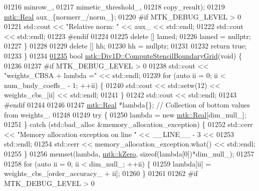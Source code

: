 \begin{DoxyCode}
{{01216                                                         minrow\_,
01217                                                         mimetic\_threshold\_,
01218                                                         copy\_result);
01219     \hyperlink{group__c01-roots_gac080bbbf5cbb5502c9f00405f894857d}{mtk::Real} aux\_\{normerr\_/norm\_\};
01220 \textcolor{preprocessor}{    #if MTK\_DEBUG\_LEVEL > 0}
01221     std::cout << \textcolor{stringliteral}{"Relative norm: "} << aux\_ << std::endl;
01222     std::cout << std::endl;
01223 \textcolor{preprocessor}{    #endif}
01224 
01225     \textcolor{keyword}{delete} [] lamed;
01226     lamed = \textcolor{keyword}{nullptr};
01227   \}
01228 
01229   \textcolor{keyword}{delete} [] hh;
01230   hh = \textcolor{keyword}{nullptr};
01231 
01232   \textcolor{keywordflow}{return} \textcolor{keyword}{true};
01233 \}
01234 
\hypertarget{mtk__div__1d_8cc_source_l01235}{}\hyperlink{classmtk_1_1Div1D_a29bb417c76286414dce9258a0bcb5aab}{01235} \textcolor{keywordtype}{bool} \hyperlink{classmtk_1_1Div1D_a29bb417c76286414dce9258a0bcb5aab}{mtk::Div1D::ComputeStencilBoundaryGrid}(\textcolor{keywordtype}{void}) \{
01236 
01237 \textcolor{preprocessor}{  #if MTK\_DEBUG\_LEVEL > 0}
01238   std::cout << \textcolor{stringliteral}{"weights\_CBSA + lambda ="} << std::endl;
01239   \textcolor{keywordflow}{for} (\textcolor{keyword}{auto} ii = 0; ii < num\_bndy\_coeffs\_ - 1; ++ii) \{
01240     std::cout << std::setw(12) << weights\_cbs\_[ii] << std::endl;
01241   \}
01242   std::cout << std::endl;
01243 \textcolor{preprocessor}{  #endif}
01244 
01246 
01247   \hyperlink{group__c01-roots_gac080bbbf5cbb5502c9f00405f894857d}{mtk::Real} *lambda\{\}; \textcolor{comment}{// Collection of bottom values from weights\_.}
01248 
01249   \textcolor{keywordflow}{try} \{
01250     lambda = \textcolor{keyword}{new} \hyperlink{group__c01-roots_gac080bbbf5cbb5502c9f00405f894857d}{mtk::Real}[dim\_null\_];
01251   \} \textcolor{keywordflow}{catch} (std::bad\_alloc &memory\_allocation\_exception) \{
01252     std::cerr << \textcolor{stringliteral}{"Memory allocation exception on line "} << \_\_LINE\_\_ - 3 <<
01253       std::endl;
01254     std::cerr << memory\_allocation\_exception.what() << std::endl;
01255   \}
01256   memset(lambda, \hyperlink{group__c01-roots_ga59a451a5fae30d59649bcda274fea271}{mtk::kZero}, \textcolor{keyword}{sizeof}(lambda[0])*dim\_null\_);
01257 
01258   \textcolor{keywordflow}{for} (\textcolor{keyword}{auto} ii = 0; ii < dim\_null\_; ++ii) \{
01259     lambda[ii] = weights\_cbs\_[order\_accuracy\_ + ii];
01260   \}
01261 
01262 \textcolor{preprocessor}{  #if MTK\_DEBUG\_LEVEL > 0}
}}
\end{DoxyCode}

